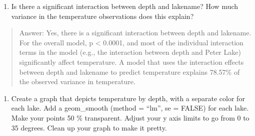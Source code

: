 \documentclass[]{article}
\newenvironment{Shaded}{\begin{snugshade}}{\end{snugshade}}
\newcommand{\CommentTok}[1]{\textcolor[rgb]{0.56,0.35,0.01}{\textit{#1}}}
\newcommand{\DataTypeTok}[1]{\textcolor[rgb]{0.13,0.29,0.53}{#1}}
\newcommand{\DecValTok}[1]{\textcolor[rgb]{0.00,0.00,0.81}{#1}}
\newcommand{\FloatTok}[1]{\textcolor[rgb]{0.00,0.00,0.81}{#1}}
\newcommand{\KeywordTok}[1]{\textcolor[rgb]{0.13,0.29,0.53}{\textbf{#1}}}
\newcommand{\NormalTok}[1]{#1}
\newcommand{\OperatorTok}[1]{\textcolor[rgb]{0.81,0.36,0.00}{\textbf{#1}}}
\newcommand{\OtherTok}[1]{\textcolor[rgb]{0.56,0.35,0.01}{#1}}
\newcommand{\StringTok}[1]{\textcolor[rgb]{0.31,0.60,0.02}{#1}}
\providecommand{\tightlist}{%
  \setlength{\itemsep}{0pt}\setlength{\parskip}{0pt}}
\begin{document}
\begin{enumerate}
\def\labelenumi{\arabic{enumi}.}
\setcounter{enumi}{6}
\tightlist
\item
  Is there a significant interaction between depth and lakename? How
  much variance in the temperature observations does this explain?
\end{enumerate}

\begin{quote}
Answer: Yes, there is a significant interaction between depth and
lakename. For the overall model, p \textless{} 0.0001, and most of the
individual interaction terms in the model (e.g., the interaction between
depth and Peter Lake) significantly affect temperature. A model that
uses the interaction effects between depth and lakename to predict
temperature explains 78.57\% of the observed variance in temperature.
\end{quote}

\begin{enumerate}
\def\labelenumi{\arabic{enumi}.}
\setcounter{enumi}{7}
\tightlist
\item
  Create a graph that depicts temperature by depth, with a separate
  color for each lake. Add a geom\_smooth (method = ``lm'', se = FALSE)
  for each lake. Make your points 50 \% transparent. Adjust your y axis
  limits to go from 0 to 35 degrees. Clean up your graph to make it
  pretty.
\end{enumerate}

\begin{Shaded}
\end{Shaded}
\end{document}
